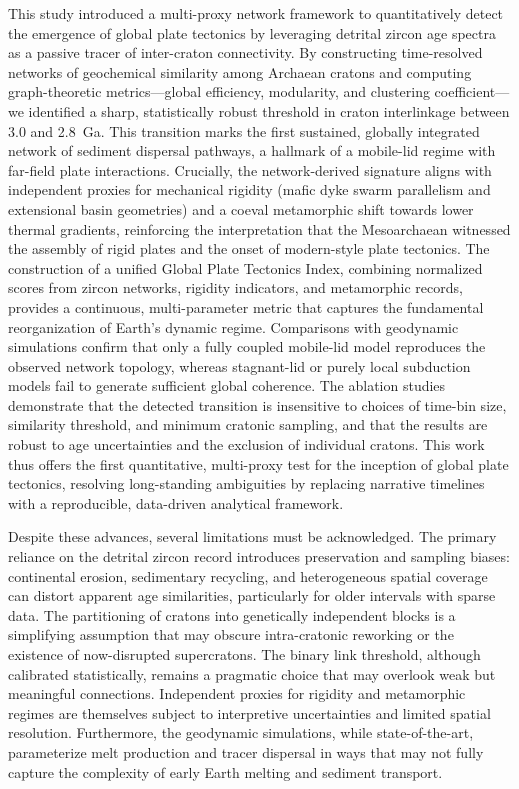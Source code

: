 \documentclass{article}
\begin{document}
This study introduced a multi-proxy network framework to quantitatively detect the emergence of global plate tectonics by leveraging detrital zircon age spectra as a passive tracer of inter-craton connectivity. By constructing time-resolved networks of geochemical similarity among Archaean cratons and computing graph-theoretic metrics---global efficiency, modularity, and clustering coefficient---we identified a sharp, statistically robust threshold in craton interlinkage between 3.0 and 2.8~Ga. This transition marks the first sustained, globally integrated network of sediment dispersal pathways, a hallmark of a mobile-lid regime with far-field plate interactions. Crucially, the network-derived signature aligns with independent proxies for mechanical rigidity (mafic dyke swarm parallelism and extensional basin geometries) and a coeval metamorphic shift towards lower thermal gradients, reinforcing the interpretation that the Mesoarchaean witnessed the assembly of rigid plates and the onset of modern-style plate tectonics. The construction of a unified Global Plate Tectonics Index, combining normalized scores from zircon networks, rigidity indicators, and metamorphic records, provides a continuous, multi-parameter metric that captures the fundamental reorganization of Earth’s dynamic regime. Comparisons with geodynamic simulations confirm that only a fully coupled mobile-lid model reproduces the observed network topology, whereas stagnant-lid or purely local subduction models fail to generate sufficient global coherence. The ablation studies demonstrate that the detected transition is insensitive to choices of time-bin size, similarity threshold, and minimum cratonic sampling, and that the results are robust to age uncertainties and the exclusion of individual cratons. This work thus offers the first quantitative, multi-proxy test for the inception of global plate tectonics, resolving long-standing ambiguities by replacing narrative timelines with a reproducible, data-driven analytical framework.

Despite these advances, several limitations must be acknowledged. The primary reliance on the detrital zircon record introduces preservation and sampling biases: continental erosion, sedimentary recycling, and heterogeneous spatial coverage can distort apparent age similarities, particularly for older intervals with sparse data. The partitioning of cratons into genetically independent blocks is a simplifying assumption that may obscure intra-cratonic reworking or the existence of now-disrupted supercratons. The binary link threshold, although calibrated statistically, remains a pragmatic choice that may overlook weak but meaningful connections. Independent proxies for rigidity and metamorphic regimes are themselves subject to interpretive uncertainties and limited spatial resolution. Furthermore, the geodynamic simulations, while state-of-the-art, parameterize melt production and tracer dispersal in ways that may not fully capture the complexity of early Earth melting and sediment transport.
\end{document}
